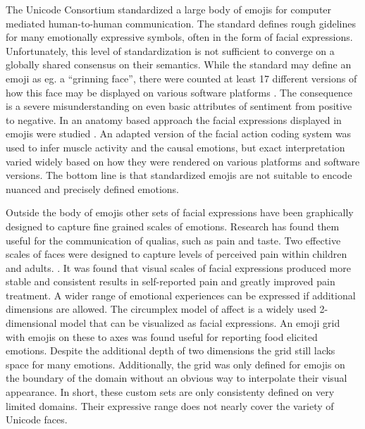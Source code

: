 \documentclass[conference]{IEEEtran}
\begin{document}
The Unicode Consortium standardized a large body of emojis for computer mediated human-to-human communication.
The standard defines rough gidelines for many emotionally expressive symbols, often in the form
of facial expressions. Unfortunately,
this level of standardization is not sufficient to converge on a globally shared consensus on their semantics.
While the standard may define an emoji as eg. a ``grinning face'', there were counted
at least 17 different versions of how this face may be displayed on various software platforms \cite{emoji_interpretation}.
The consequence is
a severe misunderstanding on even basic attributes of sentiment from positive to negative.
In an anatomy based approach the facial expressions displayed in emojis were studied \cite{emoji_facs}.
An adapted version of the facial action coding system was used to infer muscle activity and the causal emotions,
but exact interpretation varied widely based
on how they were rendered on various platforms and software versions.
The bottom line is that standardized emojis are
not suitable to encode nuanced and precisely defined emotions.

Outside the body of emojis other sets of facial expressions have been graphically
designed to capture fine grained scales of emotions.
Research has found them useful for the communication of qualias, such as pain and taste.
Two effective scales of faces were designed to capture levels of perceived pain within children and adults. \cite{bakerwong, dvprs}.
It was found that visual scales of facial expressions produced more stable and consistent results in self-reported pain and greatly improved pain treatment.
A wider range of emotional experiences can be expressed if additional dimensions are allowed.
The circumplex model of affect is a widely used 2-dimensional model \cite{circumplex} that can be visualized as facial expressions.
An emoji grid with emojis on these to axes was found useful for reporting food elicited emotions\cite{emojigrid}.
Despite the additional depth of two dimensions the grid still lacks space for many emotions.
Additionally, the grid was only defined for emojis on the boundary of the domain without an obvious way to interpolate their visual appearance.
In short, these custom sets are only consistenty defined on very limited domains.
Their expressive range does not nearly cover the variety of Unicode faces.
\end{document}
